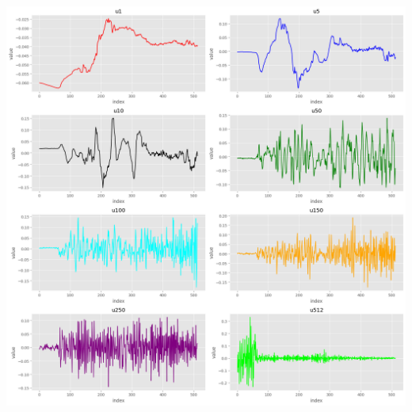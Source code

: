 \documentclass[a4paper, 12pt]{article}
\begin{document}
	\begin{center}
		\includegraphics[scale=0.4]{fig2.png}
	\end{center}
	
\end{document}
